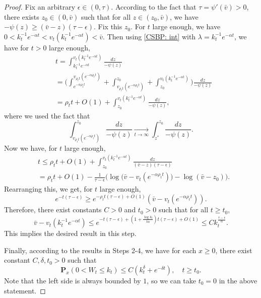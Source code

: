 \documentclass[12pt,a4paper]{amsart}
\theoremstyle{plain}
\theoremstyle{definition}
\numberwithin{equation}{section}
\begin{document}
\begin{proof}
    Fix an arbitrary $\epsilon \in (0,\tau)$.
    According to the fact that $\tau=\psi'(\bar v)>0$, there exists $z_0 \in (0,\bar v)$ such that for all $z\in (z_0, \bar v)$, we have $-\psi(z)\geq (\bar v - z)(\tau- \epsilon)$.     Fix this $z_0$.
    For $t$ large enough, we have $0<k_t^{-1}e^{-\alpha t} < v_t(k_t^{-1}e^{-\alpha t})< \bar v$. 
    Then using \eqref{CSBP: int} with $\lambda=k_t^{-1} e^{-\alpha t}$, we have for $t>0$ large enough, 
\begin{equation}\begin{split}
    &t =\int^{v_t(k_t^{-1} e^{-\alpha t})}_{k_t^{-1} e^{-\alpha t}}\frac{dz}{-\psi(z)}
    \\&= \Big(\int^{v_{\rho_t t}(e^{-\alpha \rho_t t})}_{e^{-\alpha \rho_t t}}  + \int^{z_0}_{v_{\rho_t t}(e^{-\alpha \rho_t t})} +\int^{v_t(k_t^{-1}e^{-\alpha  t})}_{z_0}\Big)\frac{dz}{-\psi(z)}
     \\&= \rho_t t + O(1) +\int^{v_t(k_t^{-1}e^{-\alpha t})}_{z_0} \frac{dz}{-\psi(z)},
\end{split}\end{equation}
    where we used the fact that
\[
    \int_{v_{\rho_t t}(e^{-\alpha \rho_tt})}^{z_0} \frac{dz}{-\psi(z)} \xrightarrow[t\to \infty] {}\int_{z^*}^{z_0} \frac{dz}{-\psi(z)}.
\]
    Now we have, for $t$ large enough,
\begin{equation}\begin{split}
    &t\leq  \rho_t t + O(1)+ \int_{z_0}^{v_t(k_t^{-1}e^{-\alpha t})} \frac{dz}{(\bar v-z)(\tau - \epsilon)}
    \\&=  \rho_t t +O(1)- \frac{1}{\tau-\epsilon}\Big( \log \big(\bar v-v_t(e^{-\alpha \rho_t t})\big) - \log(\bar v-z_0)\Big).
\end{split}\end{equation}
    Rearranging this, we get, for $t$ large enough,
\[
    e^{-t(\tau - \epsilon)} \geq e^{-\rho_t t(\tau - \epsilon)+O(1)}(\bar v - v_t(e^{-\alpha \rho_t t})).
\]
    Therefore, there exist constants $C>0$ and $t_0>0$ such that for all $t\geq t_0$,
\[
    \bar v - v_t(k_t^{-1} e^{-\alpha t}) \leq e^{-t(\tau -\epsilon)+ (1+\frac{\log k_t}{t\alpha})t(\tau - \epsilon)+O(1)}
    \leq Ck_t^{\frac{\tau - \epsilon}{\alpha}}.
\]
    This implies the desired result in this step.

    Finally, according to the results in Steps 2-4, we have for each $x\geq 0$, there exist constant $C, \delta, t_0 > 0$ such that
\[
    \mathbf P_{x}(0< W_t\leq k_t) \leq C(k_t^{\delta}+e^{-\delta t}),\quad t\geq t_0.
\]
Note that the left side is always bounded by $1$, so we can take $t_0 =0$ in the above statement.
\end{proof}
\end{document}
